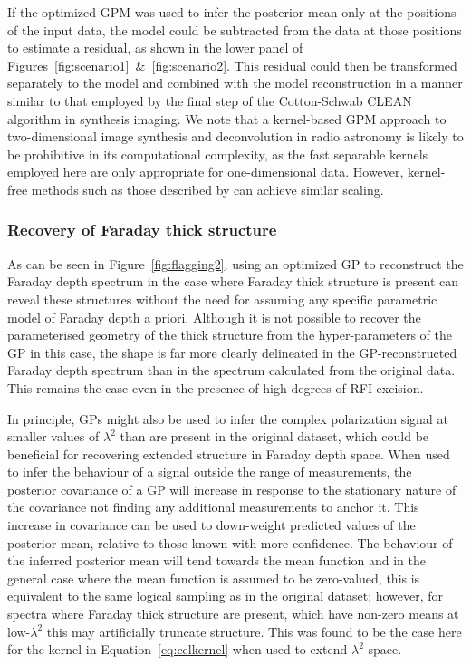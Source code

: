 \documentclass[fleqn,usenatbib]{mnras}
\begin{document}
If the optimized GPM was used to infer the posterior mean only at the positions of the input data, the model could be subtracted from the data at those positions to estimate a residual, as shown in the lower panel of Figures~\ref{fig:scenario1}~\&~\ref{fig:scenario2}. This residual could then be transformed separately to the model and combined with the model reconstruction in a manner similar to that employed by the final step of the Cotton-Schwab CLEAN algorithm in synthesis imaging. We note that a kernel-based GPM approach to two-dimensional image synthesis and deconvolution in radio astronomy is likely to be prohibitive in its computational complexity, as the fast separable kernels employed here are only appropriate for one-dimensional data. However, kernel-free methods such as those described by \cite{arras2020} can achieve similar scaling. 

\subsubsection{Recovery of Faraday thick structure}
\label{sec:thick}

As can be seen in Figure~\ref{fig:flagging2}, using an optimized GP to reconstruct the Faraday depth spectrum in the case where Faraday thick structure is present can reveal these structures without the need for assuming any specific parametric model of Faraday depth a priori. Although it is not possible to recover the parameterised geometry of the thick structure from the hyper-parameters of the GP in this case, the shape is far more clearly delineated in the GP-reconstructed Faraday depth spectrum than in the spectrum calculated from the original data. This remains the case even in the presence of high degrees of RFI excision.

In principle, GPs might also be used to infer the complex polarization signal at smaller values of $\lambda^2$ than are present in the original dataset, which could be beneficial for recovering extended structure in Faraday depth space. When used to infer the behaviour of a signal outside the range of measurements, the posterior covariance of a GP will increase in response to the stationary nature of the covariance not finding any additional measurements to anchor it. This increase in covariance can be used to down-weight predicted values of the posterior mean, relative to those known with more confidence. The behaviour of the inferred posterior mean will tend towards the mean function and in the general case where the mean function is assumed to be zero-valued, this is equivalent to the same logical sampling as in the original dataset; however, for spectra where Faraday thick structure are present, which have non-zero means at low-$\lambda^2$ this may artificially truncate structure. This was found to be the case here for the kernel in Equation~\ref{eq:celkernel} when used to extend $\lambda^2$-space.
\end{document}
